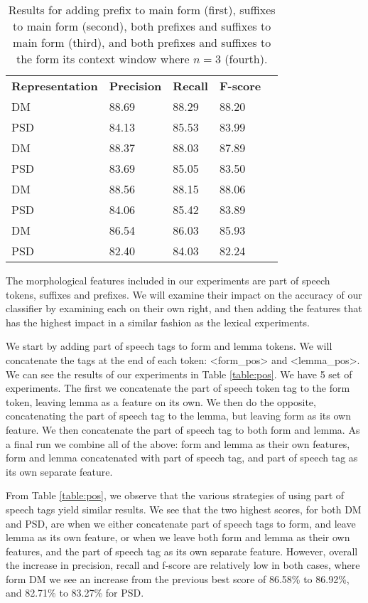 \begin{table}
    \centering
    \smaller[0.2]
    \begin{tabular}{@{}lllll@{}}
        \toprule
        \textbf{Representation} & \textbf{Precision} & \textbf{Recall} & \textbf{F-score} \\
        DM &  88.69 & 88.29 & 88.20 \\
        PSD & 84.13 & 85.53 & 83.99 \\
        \midrule
        DM &  88.37 & 88.03 & 87.89 \\
        PSD & 83.69 & 85.05 & 83.50 \\
        \midrule
        DM &  88.56 & 88.15 & 88.06 \\
        PSD & 84.06 & 85.42 & 83.89 \\
        \midrule
        DM &  86.54 & 86.03 & 85.93 \\
        PSD & 82.40 & 84.03 & 82.24 \\
        \bottomrule
    \end{tabular}
    \caption{Results for adding prefix to main form (first), suffixes to main form (second), both prefixes and suffixes to main form (third), and both prefixes and suffixes to the form its context window where $n=3$ (fourth).}
    \label{table:affix_suffix}
\end{table}

The morphological features included in our experiments are part of speech tokens, suffixes and prefixes. We will examine their impact on the accuracy of our classifier by examining each on their own right, and then adding the features that has the highest impact in a similar fashion as the lexical experiments. 

We start by adding part of speech tags to form and lemma tokens. We will concatenate the tags at the end of each token: <form\_pos> and <lemma\_pos>. We can see the results of our experiments in Table \ref{table:pos}. We have 5 set of experiments. The first we concatenate the part of speech token tag to the form token, leaving lemma as a feature on its own. We then do the opposite, concatenating the part of speech tag to the lemma, but leaving form as its own feature. We then concatenate the part of speech tag to both form and lemma. As a final run we combine all of the above: form and lemma as their own features, form and lemma concatenated with part of speech tag, and part of speech tag as its own separate feature. 

From Table \ref{table:pos}, we observe that the various strategies of using part of speech tags yield similar results. We see that the two highest scores, for both DM and PSD, are when we either concatenate part of speech tags to form, and leave lemma as its own feature, or when we leave both form and lemma as their own features, and the part of speech tag as its own separate feature. However, overall the increase in precision, recall and f-score are relatively low in both cases, where form DM we see an increase from the previous best score of 86.58\% to 86.92\%, and 82.71\% to 83.27\% for PSD.

